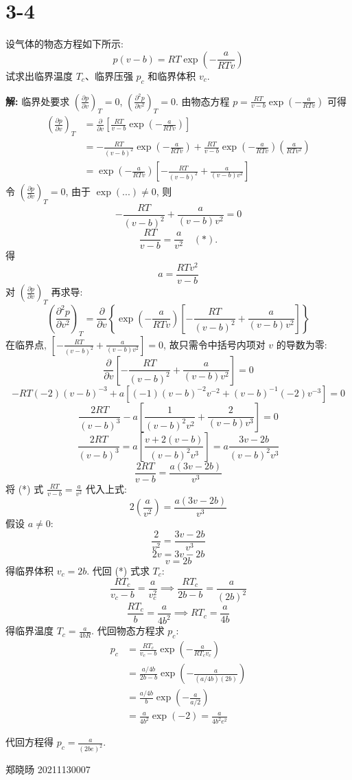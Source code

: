 \documentclass{article}
\begin{document}
\hrulefill

\section*{3-4}
设气体的物态方程如下所示:
\[ p(v - b) = RT \exp\left(-\frac{a}{RTv}\right) \]
试求出临界温度 $T_c$、临界压强 $p_c$ 和临界体积 $v_c$.

\textbf{解:} 临界处要求 $\left( \frac{\partial p}{\partial v} \right)_T = 0$, $\left( \frac{\partial^2 p}{\partial v^2} \right)_T = 0$.
由物态方程 $p = \frac{RT}{v-b} \exp\left(-\frac{a}{RTv}\right)$ 可得
\begin{align*} \left( \frac{\partial p}{\partial v} \right)_T &= \frac{\partial}{\partial v} \left[ \frac{RT}{v-b} \exp\left(-\frac{a}{RTv}\right) \right] \\ &= -\frac{RT}{(v-b)^2} \exp\left(-\frac{a}{RTv}\right) + \frac{RT}{v-b} \exp\left(-\frac{a}{RTv}\right) \left( \frac{a}{RTv^2} \right) \\ &= \exp\left(-\frac{a}{RTv}\right) \left[ -\frac{RT}{(v-b)^2} + \frac{a}{(v-b)v^2} \right] \end{align*}
令 $\left( \frac{\partial p}{\partial v} \right)_T = 0$, 由于 $\exp(...) \neq 0$, 则
\[ -\frac{RT}{(v-b)^2} + \frac{a}{(v-b)v^2} = 0 \]
\[ \frac{RT}{v-b} = \frac{a}{v^2} \quad (*). \]
得
\[ a = \frac{RT v^2}{v-b} \]
对 $\left( \frac{\partial p}{\partial v} \right)_T$ 再求导:
\[ \left( \frac{\partial^2 p}{\partial v^2} \right)_T = \frac{\partial}{\partial v} \left\{ \exp\left(-\frac{a}{RTv}\right) \left[ -\frac{RT}{(v-b)^2} + \frac{a}{(v-b)v^2} \right] \right\} \]
在临界点, $\left[ -\frac{RT}{(v-b)^2} + \frac{a}{(v-b)v^2} \right] = 0$, 故只需令中括号内项对 $v$ 的导数为零:
\[ \frac{\partial}{\partial v} \left[ -\frac{RT}{(v-b)^2} + \frac{a}{(v-b)v^2} \right] = 0 \]
\[ -RT(-2)(v-b)^{-3} + a \left[ (-1)(v-b)^{-2}v^{-2} + (v-b)^{-1}(-2)v^{-3} \right] = 0 \]
\[ \frac{2RT}{(v-b)^3} - a \left[ \frac{1}{(v-b)^2 v^2} + \frac{2}{(v-b)v^3} \right] = 0 \]
\[ \frac{2RT}{(v-b)^3} = a \left[ \frac{v + 2(v-b)}{(v-b)^2 v^3} \right] = a \frac{3v-2b}{(v-b)^2 v^3} \]
\[ \frac{2RT}{v-b} = \frac{a(3v-2b)}{v^3} \]
将 (*) 式 $\frac{RT}{v-b} = \frac{a}{v^2}$ 代入上式:
\[ 2 \left( \frac{a}{v^2} \right) = \frac{a(3v-2b)}{v^3} \]
假设 $a \neq 0$:
\[ \frac{2}{v^2} = \frac{3v-2b}{v^3} \]
\[ 2v = 3v - 2b \]
\[ v = 2b \]
得临界体积 $v_c = 2b$.
代回 (*) 式求 $T_c$:
\[ \frac{RT_c}{v_c-b} = \frac{a}{v_c^2} \implies \frac{RT_c}{2b-b} = \frac{a}{(2b)^2} \]
\[ \frac{RT_c}{b} = \frac{a}{4b^2} \implies RT_c = \frac{a}{4b} \]
得临界温度 $T_c = \frac{a}{4bR}$.
代回物态方程求 $p_c$:
\begin{align*} p_c &= \frac{RT_c}{v_c-b} \exp\left(-\frac{a}{RT_c v_c}\right) \\ &= \frac{a/4b}{2b-b} \exp\left(-\frac{a}{(a/4b)(2b)}\right) \\ &= \frac{a/4b}{b} \exp\left(-\frac{a}{a/2}\right) \\ &= \frac{a}{4b^2} \exp(-2) = \frac{a}{4b^2 e^2} \end{align*}

代回方程得 $p_c = \frac{a}{(2be)^2}$.

\vspace{1cm}
\hfill 郑晓旸 20211130007
\end{document}

